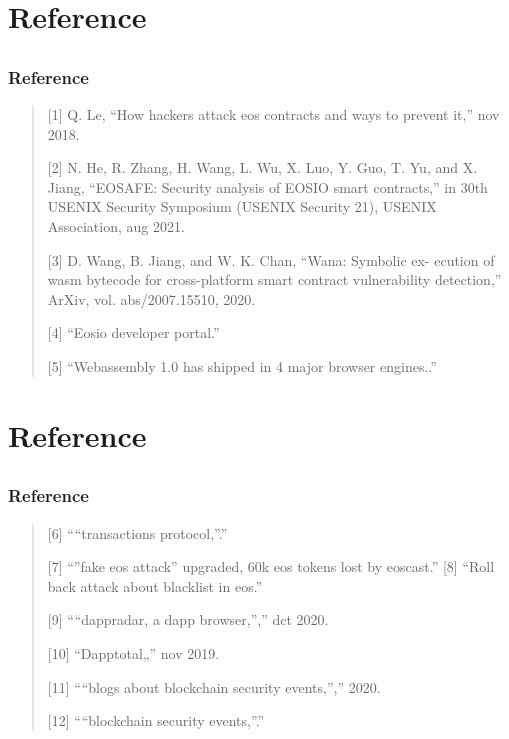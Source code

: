 \documentclass[notheorems, aspectratio=54]{beamer}
\begin{document}

\section{Reference}
\subsection{}
\begin{frame}
    \frametitle{Reference}
    
    \begin{quotation}
        [1] Q. Le, “How hackers attack eos contracts and ways to prevent it,” nov 2018.

        [2] N. He, R. Zhang, H. Wang, L. Wu, X. Luo, Y. Guo, T. Yu, and X. Jiang, “EOSAFE: Security analysis of EOSIO smart contracts,” in 30th USENIX Security Symposium (USENIX Security 21), USENIX Association, aug 2021.

        [3] D. Wang, B. Jiang, and W. K. Chan, “Wana: Symbolic ex- ecution of wasm bytecode for cross-platform smart contract vulnerability detection,” ArXiv, vol. abs/2007.15510, 2020.

        [4] “Eosio developer portal.”

        [5] “Webassembly 1.0 has shipped in 4 major browser engines..” 
    \end{quotation}

\end{frame}


\section{Reference}
\subsection{}
\begin{frame}
    \frametitle{Reference}
    
    \begin{quotation}
        [6] ““transactions protocol,”.”

        [7] “”fake eos attack” upgraded, 60k eos tokens lost by eoscast.”
        [8] “Roll back attack about blacklist in eos.”

        [9] ““dappradar, a dapp browser,”,” dct 2020.

        [10] “Dapptotal„” nov 2019.

        [11] ““blogs about blockchain security events,”,” 2020. 

        [12] ““blockchain security events,”.”
    \end{quotation}

\end{frame}
\end{document}
